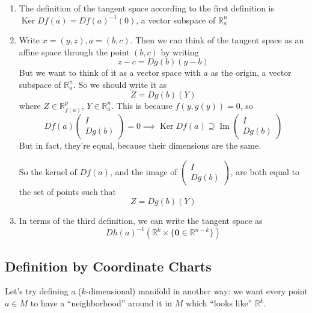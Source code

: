 \documentclass{article}
\DeclareMathOperator{\Ker}{Ker}
\DeclareMathOperator{\Ima}{Im}
\newcommand{\reals}[0]{\mathbb{R}}
\newcommand{\mb}[1]{\mathbf{#1}}
\begin{document}
\begin{enumerate}

  \item The definition of the tangent space according to the first definition is \(\Ker Df(a) = Df(a)^{-1}(0)\), a vector subspace of \(\reals^n_a\)

  \item Write \(x = (y, z), a = (b, c)\). Then we can think of the tangent space as an affine space through the point \((b, c)\) by writing
  \[z - c = Dg(b)(y - b)\]
  But we want to think of it as a vector space with \(a\) as the origin, a vector subspace of \(\reals^n_a\). So we should write it as
  \[Z = Dg(b)(Y)\]
  where \(Z \in \reals_{f(a)}^p\), \(Y \in \reals_a^n\). This is because \(f(y, g(y)) = 0\), so
  \[Df(a)\begin{pmatrix} I \\ Dg(b) \end{pmatrix} = 0 \implies \Ker Df(a) \supseteq \Ima\begin{pmatrix} I \\ Dg(b) \end{pmatrix}\]
  But in fact, they're equal, because their dimensions are the same.

  So the kernel of \(Df(a)\), and the image of \(\begin{pmatrix} I \\ Dg(b) \end{pmatrix}\), are both equal to the set of points such that
  \[Z = Dg(b)(Y)\]

  \item In terms of the third definition, we can write the tangent space as
  \[Dh(a)^{-1}(\reals^k \times \{\mb{0} \in \reals^{n - k}\})\]

\end{enumerate}

\subsection{Definition by Coordinate Charts}

Let's try defining a (\(k\)-dimensional) manifold in another way: we want every point \(a \in M\) to have a ``neighborhood'' around it in \(M\) which ``looks like'' \(\reals^k\).
\end{document}

